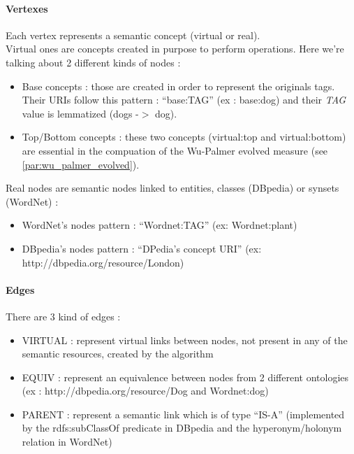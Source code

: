 \paragraph{Vertexes} %
\label{par:vertexes}
Each vertex represents a semantic concept (virtual or real).\\
Virtual ones are concepts created in purpose to perform operations. Here we’re talking about 2 different kinds of nodes :
\begin{itemize}
	\item Base concepts : those are created in order to represent the originals tags. Their URIs follow this pattern : “base:TAG” (ex : base:dog) and their \emph{TAG} value is lemmatized (dogs -$>$ dog).
	\item Top/Bottom concepts : these two concepts (virtual:top and virtual:bottom) are essential in the compuation of the Wu-Palmer evolved measure (see \ref{par:wu_palmer_evolved}).
\end{itemize}
Real nodes are semantic nodes linked to entities, classes (DBpedia) or synsets (WordNet) :
\begin{itemize}
	\item WordNet's nodes pattern : “Wordnet:TAG” (ex: Wordnet:plant)
	\item DBpedia's nodes pattern : “DPedia’s concept URI” (ex: http://dbpedia.org/resource/London)
\end{itemize}
\paragraph{Edges} %
\label{par:edges}
There are 3 kind of edges :
\begin{itemize}
	\item VIRTUAL : represent virtual links between nodes, not present in any of the semantic resources, created by the algorithm
	\item EQUIV : represent an equivalence between nodes from 2 different ontologies \\
	(ex : http://dbpedia.org/resource/Dog and Wordnet:dog)
	\item PARENT : represent a semantic link which is of type “IS-A” (implemented by the rdfs:subClassOf predicate in DBpedia and the hyperonym/holonym relation in WordNet)
\end{itemize}
